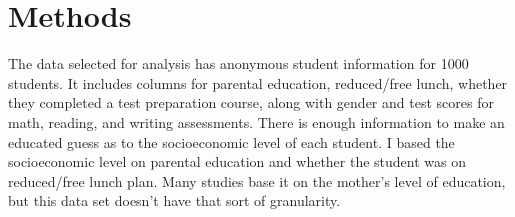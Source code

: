 \documentclass[fleqn,10pt]{olplainarticle}
\begin{document}
\section*{Methods}
The data selected for analysis has anonymous student information for 1000 students. It includes columns for parental education, reduced/free lunch, whether they completed a test preparation course, along with gender and test scores for math, reading, and writing assessments. There is enough information to make an educated guess as to the socioeconomic level of each student. I based the socioeconomic level on parental education and whether the student was on reduced/free lunch plan.  Many studies base it on the mother's level of education, but this data set doesn't have that sort of granularity. \citep{maternaleducation} \citep{maternaleducation2} \citep{maternaleducation3}
\end{document}
